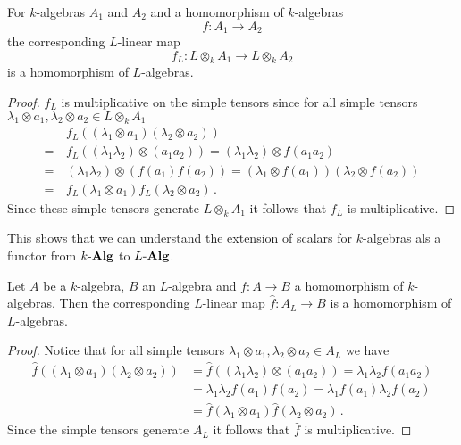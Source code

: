 \begin{lemma}
  For $k$-algebras $A_1$ and $A_2$ and a homomorphism of $k$-algebras
  \[
    f \colon A_1 \to A_2
  \]
  the corresponding $L$-linear map
  \[
            f_L
    \colon  L \otimes_k A_1
    \to     L \otimes_k A_2
  \]
  is a homomorphism of $L$-algebras.
\end{lemma}
\begin{proof}
  $f_L$ is multiplicative on the simple tensors since for all simple tensors $\lambda_1 \otimes a_1, \lambda_2 \otimes a_2 \in L \otimes_k A_1$
  \begin{align*}
     &\,  f_L((\lambda_1 \otimes a_1)(\lambda_2 \otimes a_2))   \\
    =&\,  f_L((\lambda_1 \lambda_2) \otimes (a_1 a_2))
    =     (\lambda_1 \lambda_2) \otimes f(a_1 a_2) \\
    =&\,  (\lambda_1 \lambda_2) \otimes (f(a_1)f(a_2))
    =     (\lambda_1 \otimes f(a_1)) (\lambda_2 \otimes f(a_2)) \\
    =&\,  f_L(\lambda_1 \otimes a_1) f_L(\lambda_2 \otimes a_2) \,.
  \end{align*}
  Since these simple tensors generate $L \otimes_k A_1$ it follows that $f_L$ is multiplicative.
\end{proof}
  
  
This shows that we can understand the extension of scalars for $k$-algebras als a functor from $k\text{-}\mathbf{Alg}$ to $L\text{-}\mathbf{Alg}$.


\begin{lemma}
  Let $A$ be a $k$-algebra, $B$ an $L$-algebra and $f \colon A \to B$ a homomorphism of $k$-algebras.
  Then the corresponding $L$-linear map $\hat{f} \colon A_L \to B$ is a homomorphism of $L$-algebras.
  \begin{proof}
  Notice that for all simple tensors $\lambda_1 \otimes a_1, \lambda_2 \otimes a_2 \in A_L$ we have
    \begin{align*}
          \hat{f}((\lambda_1 \otimes a_1)(\lambda_2 \otimes a_2))
      &=  \hat{f}((\lambda_1 \lambda_2) \otimes (a_1 a_2))
       =  \lambda_1 \lambda_2 f(a_1 a_2)    \\
      &=  \lambda_1 \lambda_2 f(a_1) f(a_2)
       =  \lambda_1 f(a_1) \lambda_2 f(a_2) \\
      &=  \hat{f}(\lambda_1 \otimes a_1) \hat{f}(\lambda_2 \otimes a_2) \,.
    \end{align*}
    Since the simple tensors generate $A_L$ it follows that $\hat{f}$ is multiplicative.
  \end{proof}
\end{lemma}



